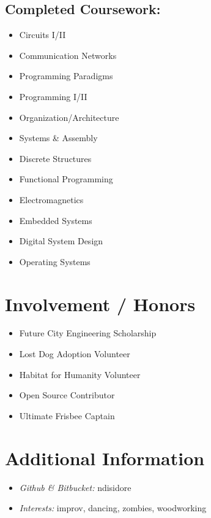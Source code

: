\documentclass[10pt]{article}
\begin{document}
\subsection*{Completed Coursework:}
\begin{multicols}{4}
  \begin{itemize}
    \item Circuits I/II
    \item Communication Networks
    \item Programming Paradigms
    \item Programming I/II
    \item Organization/Architecture
    \item Systems \& Assembly
    \item Discrete Structures
    \item Functional Programming
    \item Electromagnetics
    \item Embedded Systems
    \item Digital System Design
    \item Operating Systems
  \end{itemize}
\end{multicols}

\section*{Involvement / Honors}
\begin{multicols}{3}
  \begin{itemize}
    \item Future City Engineering Scholarship
    \item Lost Dog Adoption Volunteer
    \item Habitat for Humanity Volunteer
    \item Open Source Contributor
    \item Ultimate Frisbee Captain
  \end{itemize}
\end{multicols}

\enlargethispage{3\baselineskip}

\section*{Additional Information}
\begin{multicols}{2}
  \begin{itemize}
    \item \textit{Github \& Bitbucket:} ndisidore
    \item \textit{Interests:} improv, dancing, zombies, woodworking
  \end{itemize}
\end{multicols}
\end{document}
